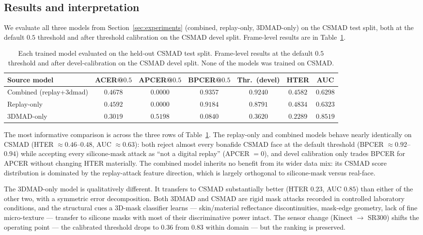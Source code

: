 \documentclass[anonymous, manuscript, screen, review]{acmart}
\begin{document}
\subsection{Results and interpretation}

We evaluate all three models from Section~\ref{sec:experiments}
(combined, replay-only, 3DMAD-only) on the CSMAD test split, both at
the default $0{.}5$ threshold and after threshold calibration on the
CSMAD devel split. Frame-level results are in
Table~\ref{tab:cross-csmad}.

\begin{table}[htbp]
\centering
\caption{Each trained model evaluated on the held-out CSMAD test split.
Frame-level results at the default $0{.}5$ threshold and after
devel-calibration on the CSMAD devel split. None of the models was
trained on CSMAD.}
\label{tab:cross-csmad}
\small
\begin{tabular}{l c c c c c c}
\toprule
Source model & ACER@$0.5$ & APCER@$0.5$ & BPCER@$0.5$ & Thr.\ (devel) & HTER & AUC \\
\midrule
Combined (replay+3dmad) & $0{.}4678$ & $0{.}0000$ & $0{.}9357$ & $0{.}9240$ & $0{.}4582$ & $0{.}6298$ \\
Replay-only             & $0{.}4592$ & $0{.}0000$ & $0{.}9184$ & $0{.}8791$ & $0{.}4834$ & $0{.}6323$ \\
3DMAD-only              & $0{.}3019$ & $0{.}5198$ & $0{.}0840$ & $0{.}3620$ & $0{.}2289$ & $0{.}8519$ \\
\bottomrule
\end{tabular}
\end{table}

The most informative comparison is across the three rows of
Table~\ref{tab:cross-csmad}. The replay-only and combined models
behave nearly identically on CSMAD (HTER $\approx 0{.}46$--$0{.}48$,
AUC $\approx 0{.}63$): both reject almost every bonafide CSMAD face at
the default threshold (BPCER $\approx 0{.}92$--$0{.}94$) while accepting
every silicone-mask attack as ``not a digital replay'' (APCER $=0$),
and devel calibration only trades BPCER for APCER without changing HTER
materially. The combined model inherits no benefit from its wider data
mix: its CSMAD score distribution is dominated by the replay-attack
feature direction, which is largely orthogonal to silicone-mask versus
real-face.

The 3DMAD-only model is qualitatively different. It transfers to CSMAD
substantially better (HTER $0{.}23$, AUC $0{.}85$) than either of the
other two, with a symmetric error decomposition. Both 3DMAD and CSMAD
are rigid mask attacks recorded in controlled laboratory conditions,
and the structural cues a 3D-mask classifier learns --- skin/material
reflectance discontinuities, mask-edge geometry, lack of fine
micro-texture --- transfer to silicone masks with most of their
discriminative power intact. The sensor change (Kinect $\rightarrow$
SR300) shifts the operating point --- the calibrated threshold drops to
$0{.}36$ from $0{.}83$ within domain --- but the ranking is preserved.
\end{document}
